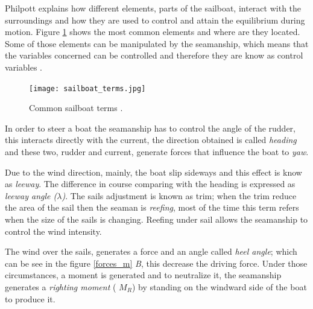 Philpott explains how different elements, parts of the sailboat, interact with the surroundings and how they are used to control and attain the equilibrium during motion. Figure \ref{sailboat_terms} shows the most common elements and where are they located. Some of those elements can be manipulated by the seamanship, which means that the variables concerned can be controlled and therefore they are know as control variables \cite{philpott1993yacht}. \par
 \begin{figure}%
\centering
  \texttt{[image: sailboat\_terms.jpg]}
 \caption{Common sailboat terms \cite{sailboat_terms}. }
\label{sailboat_terms}
\end{figure}
In order to steer a boat the seamanship has to control the angle of the rudder, this interacts directly with the current, the direction obtained is called \textit{heading} and these two, rudder and current, generate forces that influence the boat to \textit{yaw}. \par
Due to the wind direction, mainly, the boat slip sideways and this effect is know as \textit{leeway}. The difference in course comparing with the heading is expressed as \textit{leeway angle ($\lambda$)}. %
The sails adjustment is known as trim; when the trim reduce the area of the sail then the seaman is \textit{reefing}, most of the time this term refers when the size of the sails is changing.  Reefing under sail allows the seamanship to control the wind intensity. \par
The wind over the sails, generates a force and an angle called \textit{heel angle}; which can be see in the figure \ref{forces_m} \textit{B}, this decrease the driving force. Under those circumstances, a moment is generated and to neutralize it, the seamanship generates a \textit{righting moment} (\textit{ $M_{R}$}) by standing on the windward side of the boat to produce it\cite{philpott1993yacht}. %
